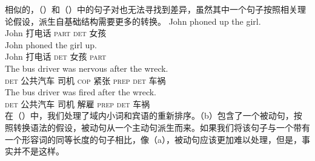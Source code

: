 相似的，（）和（）中的句子对也无法寻找到差异，虽然其中一个句子按照相关理论假设，派生自基础结构需要更多的转换\citep*[]{FBG74a-u}。
\eal
\ex 
\gll John phoned up the girl.\\
    John 打电话 \textsc{part} \textsc{det} 女孩\\
\ex 
\gll John phoned the girl up.\\
    John 打电话 \textsc{det} 女孩 \textsc{part}\\
\zl
\eal
\ex 
\gll The bus driver was nervous after the wreck.\\
    \textsc{det} 公共汽车 司机 \textsc{cop} 紧张 \textsc{prep} \textsc{det} 车祸\\
\ex 
\gll The bus driver was fired after the wreck.\\
    \textsc{det} 公共汽车 司机 \passivepst{} 解雇 \textsc{prep} \textsc{det} 车祸\\
\zl
在（）中，我们处理了域内小词和宾语的重新排序。（b）包含了一个被动句，按照转换语法的假设，被动句从一个主动句派生而来。如果我们将该句子与一个带有一个形容词的同等长度的句子相比，像（a），被动句应该更加难以处理，但是，事实并不是这样。

